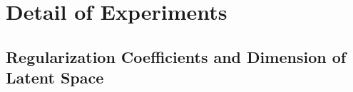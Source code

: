 

\section{Detail of Experiments}
\label{app:experiment_setting}


\subsection{Regularization Coefficients and Dimension of Latent Space}
\label{app:decide_alpha_and_beta}

